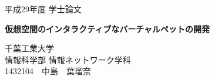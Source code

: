 \thispagestyle{empty}
\begin{center}
{\Large 平成29年度 学士論文}\\

\vspace{3cm}

\textbf{{\LARGE  仮想空間のインタラクティブなバーチャルペットの開発}}\\
\vspace{2mm}

\vspace{11cm}

{\Large 千葉工業大学}\\
\vspace{2mm}
{\Large 情報科学部 情報ネットワーク学科}\\
\vspace{4mm}
{\Large 1432104　中島　葉瑠奈}\\

\end{center}

\vspace{4cm}

\begin{flushright}
\hspace{5cm}{\Large 指導教員}\underline{\hspace{2cm}{\Large 菅原　研次}}\\
\vspace{4mm}
\underline{\hspace{20mm}{\Large 真部　雄介}}\\
\end{flushright}


\newpage
{}
\setcounter{page}{1}
\tableofcontents
\listoffigures
\listoftables

\newpage
{}
\setcounter{page}{1}

